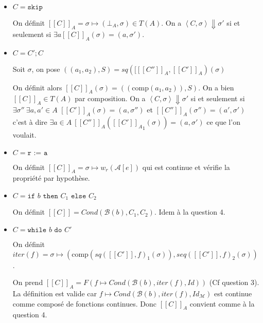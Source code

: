 \documentclass{article}
\newcommand{\M}{\mathcal{M}}
\newcommand{\Cr}[1]{[\![#1]\!]}
\newcommand{\Co}[1]{\left \langle #1 \right \rangle}
\newcommand{\comp}{\text{comp}}
\begin{document}
\begin{itemize}
    \item $C = \texttt{skip}$
    
    On définit $\Cr{C}_A = \sigma \mapsto \left (\bot_A, \sigma\right ) \in T\left (A\right )$. On a $\Co{C, \sigma} \Downarrow \sigma'$ si et seulement si $\exists a \Cr{C}_A\left (\sigma\right ) = \left (a, \sigma'\right )$.
    
    \item $C = C' ; C$
    
    Soit $\sigma$, on pose $ \left (\left (a_1,a_2\right ),S\right )=sq\left ([\Cr{C''}_A,\Cr{C'}_A\right )\left (\sigma\right )$ 
    
    On définit alors $\Cr{C}_A\left (\sigma\right ) =\left ( \left (\comp\left (a_1,a_2\right )\right ), S\right )$. On a bien $\Cr{C}_A \in T\left (A\right )$ par composition. 
    On a $\Co{C, \sigma} \Downarrow \sigma'$ si et seulement si  $\exists \sigma'' \: \exists a, a' \in A$ $\Cr{C'}_A\left (\sigma\right ) = \left (a, \sigma''\right )$ et $\Cr{C''}_A\left (\sigma''\right ) = \left (a', \sigma'\right )$ c'est à dire $\exists a \in A \: \Cr{C''}_A\left ({\Cr{C'}_A}_1\left (\sigma\right )\right ) = \left (a, \sigma'\right )$ ce que l'on voulait.
    
    \item $C = \texttt{r := a}$
    
     On définit $\Cr{C}_A = \sigma \mapsto w_r\left (\mathcal{A}[e]\right )$ qui est continue et vérifie la propriété par hypothèse.
    
    \item $C = \texttt{if } b \texttt{ then } C_1 \texttt{ else } C_2$

        On définit $\Cr{C} = Cond\left (\mathcal{B}\left (b\right ), C_1, C_2\right )$. Idem à la question 4.
    
    \item $C = \texttt{while } b \texttt{ do } C'$
    
    On définit  $iter\left (f\right ) = \sigma \mapsto \left (\comp\left (sq\left (\Cr{C'}, f\right )_1\left (\sigma\right )\right ), seq\left (\Cr{C'}, f\right )_2\left (\sigma\right )\right )$.
     
     On prend $\Cr{C}_A = F\left (f \mapsto Cond\left (\mathcal{B}\left (b\right ), iter\left (f\right ), Id\right )\right )$ (Cf question 3). La définition est valide car $f \mapsto Cond\left (\mathcal{B}\left (b\right ), iter\left (f\right ), Id_\M\right )$ est continue comme composé de fonctions continues. Donc $\Cr{C}_A$ convient comme à la question 4.
\end{itemize}
\end{document}
